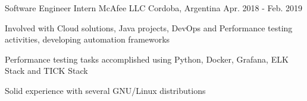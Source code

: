 \begin{cventries}
  \cventry
    {Software Engineer Intern} %
    {McAfee LLC} %
    {Cordoba, Argentina} %
    {Apr. 2018 - Feb. 2019} %
    {
      \begin{cvitems} %
        \item {Involved with Cloud solutions, Java projects, DevOps and Performance testing activities, developing automation frameworks}
        \item {Performance testing tasks accomplished using Python, Docker, Grafana, ELK Stack and TICK Stack}
        \item { Solid experience with several GNU/Linux distributions}
      \end{cvitems}
    }

\end{cventries}
